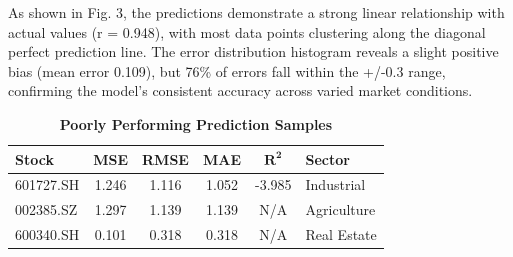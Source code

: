 \documentclass[3p,times,procedia]{elsarticle}
\begin{document}
As shown in Fig. 3, the predictions demonstrate a strong linear relationship with actual values (r = 0.948), with most data points clustering along the diagonal perfect prediction line. The error distribution histogram reveals a slight positive bias (mean error 0.109), but 76\% of errors fall within the +/-0.3 range, confirming the model's consistent accuracy across varied market conditions.




\begin{table}[!ht]
\renewcommand{\arraystretch}{1.5} %
\centering
\large %
\caption{\textbf{Poorly Performing Prediction Samples}}
\begin{tabular}{|l|c|c|c|c|l|}
\hline
\textbf{Stock} & \textbf{MSE} & \textbf{RMSE} & \textbf{MAE} & \textbf{$\mathbf{R^2}$} & \textbf{Sector} \\
\hline
601727.SH & 1.246 & 1.116 & 1.052 & -3.985 & Industrial \\
002385.SZ & 1.297 & 1.139 & 1.139 & N/A    & Agriculture \\
600340.SH & 0.101 & 0.318 & 0.318 & N/A    & Real Estate \\
\hline
\end{tabular}
\end{table}

\end{document}
